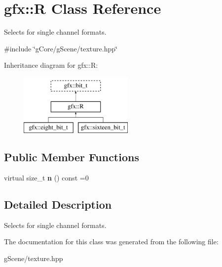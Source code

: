 \hypertarget{classgfx_1_1R}{\section{gfx\-:\-:R Class Reference}
\label{classgfx_1_1R}
}


Selects for single channel formats.  




{\ttfamily \#include \char`\"{}g\-Core/g\-Scene/texture.\-hpp\char`\"{}}

Inheritance diagram for gfx\-:\-:R\-:\begin{figure}[H]
\begin{center}
\leavevmode
\includegraphics[height=3.000000cm]{classgfx_1_1R}
\end{center}
\end{figure}
\subsection*{Public Member Functions}
\begin{DoxyCompactItemize}
\item 
\hypertarget{classgfx_1_1R_a1ae37ad45532503dc88ec329ba938c8f}{virtual size\-\_\-t {\bfseries n} () const =0}\label{classgfx_1_1R_a1ae37ad45532503dc88ec329ba938c8f}

\end{DoxyCompactItemize}


\subsection{Detailed Description}
Selects for single channel formats. 

The documentation for this class was generated from the following file\-:\begin{DoxyCompactItemize}
\item 
g\-Scene/texture.\-hpp\end{DoxyCompactItemize}
